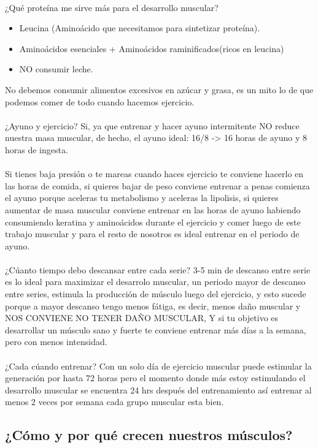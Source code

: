 \documentclass{article}
\begin{document}
\\
¿Qué proteína me sirve más para el desarrollo muscular? 
\begin{itemize}
    \item Leucina (Aminoácido que necesitamos para sintetizar proteína).
    \item Aminoácidos esenciales + Aminoácidos raminificados(ricos en leucina)
    \item NO consumir leche.
\end{itemize}
No debemos consumir alimentos excesivos en azúcar y grasa, es un mito lo de que podemos comer de todo cuando hacemos ejercicio.\\
\\
¿Ayuno y ejercicio? Si, ya que entrenar y hacer ayuno intermitente NO reduce nuestra masa muscular, de hecho, el ayuno ideal: 16/8 -> 16 horas de ayuno y 8 horas de ingesta.\\
\\
Si tienes baja presión o te mareas cuando haces ejercicio te conviene hacerlo en las horas de comida, si quieres bajar de peso conviene entrenar a penas comienza el ayuno porque aceleras tu metabolismo y aceleras la lipolisis, si quieres aumentar de masa muscular conviene entrenar en las horas de ayuno habiendo consumiendo keratina y aminoácidos durante el ejercicio y comer luego de este trabajo muscular y para el resto de nosotros es ideal entrenar en el periodo de ayuno.\\
\\
¿Cúanto tiempo debo descansar entre cada serie? 3-5 min de descanso entre serie es lo ideal para maximizar el desarrolo muscular, un periodo mayor de descanso entre series, estimula la producción de músculo luego del ejercicio, y esto sucede porque a mayor descanso tengo menos fátiga, es decir, menos daño muscular y NOS CONVIENE NO TENER DAÑO MUSCULAR, Y si tu objetivo es desarrollar un músculo sano y fuerte te conviene entrenar más días a la semana, pero con menos intensidad.\\
\\
¿Cada cúando entrenar? Con un solo día de ejercicio muscular puede estimular la generación por hasta 72 horas pero el momento donde más estoy estimulando el desarrollo muscular se encuentra 24 hrs después del entrenamiento así entrenar al menos 2 veces por semana cada grupo muscular esta bien.\\
\subsection{¿Cómo y por qué crecen nuestros músculos?}
\end{document}
